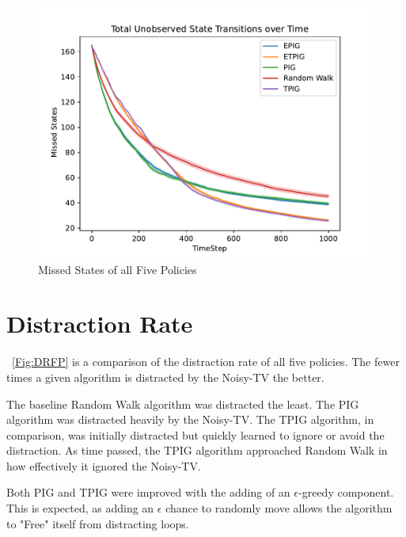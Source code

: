 \documentclass[12pt]{thesis}
\begin{document}
\begin{figure}
	\begin{center}
	\includegraphics[scale=0.75]{"images/Missed_States.pdf"}
	\end{center}
	\caption{Missed States of all Five Policies}
	\label{Fig:MSFP}
\end{figure}
\section{Distraction Rate}
\figurename~\ref{Fig:DRFP} is a comparison of the distraction rate of all five policies. The fewer times a given algorithm is distracted by the Noisy-TV the better.

The baseline Random Walk algorithm was distracted the least. The PIG algorithm was distracted heavily by the Noisy-TV. The TPIG algorithm, in comparison, was initially distracted but quickly learned to ignore or avoid the distraction. As time passed, the TPIG algorithm approached Random Walk in how effectively it ignored the Noisy-TV.

Both PIG and TPIG were improved with the adding of an $\epsilon$-greedy component. This is expected, as adding an $\epsilon$ chance to randomly move allows the algorithm to "Free" itself from distracting loops.
\end{document}
